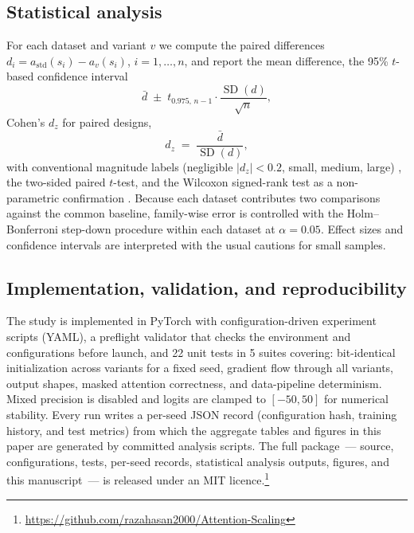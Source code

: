 \subsection{Statistical analysis}\label{sec:stats}
For each dataset and variant $v$ we compute the paired differences
$d_i = a_{\text{std}}(s_i) - a_{v}(s_i)$, $i = 1, \dots, n$, and report the mean
difference, the 95\% $t$-based confidence interval
\begin{equation}\label{eq:ci}
  \bar d \;\pm\; t_{0.975,\,n-1} \cdot \frac{\operatorname{SD}(d)}{\sqrt{n}},
\end{equation}
Cohen's $d_z$ for paired designs,
\begin{equation}\label{eq:dz}
  d_z \;=\; \frac{\bar d}{\operatorname{SD}(d)},
\end{equation}
with conventional magnitude labels (negligible $|d_z| < 0.2$, small, medium,
large) \cite{cohen1988}, the two-sided paired $t$-test, and the Wilcoxon
signed-rank test as a non-parametric confirmation \cite{wilcoxon1945}. Because
each dataset contributes two comparisons against the common baseline, family-wise
error is controlled with the Holm--Bonferroni step-down procedure
\cite{holm1979} within each dataset at $\alpha = 0.05$. Effect sizes and
confidence intervals are interpreted with the usual cautions for small samples.

\subsection{Implementation, validation, and reproducibility}\label{sec:impl}
The study is implemented in PyTorch with configuration-driven experiment scripts
(YAML), a preflight validator that checks the environment and configurations
before launch, and 22 unit tests in 5 suites covering: bit-identical
initialization across variants for a fixed seed, gradient flow through all
variants, output shapes, masked attention correctness, and data-pipeline
determinism. Mixed precision is disabled and logits are clamped to $[-50, 50]$
for numerical stability. Every run writes a per-seed JSON record (configuration
hash, training history, and test metrics) from which the aggregate tables and
figures in this paper are generated by committed analysis scripts. The full
package~--- source, configurations, tests, per-seed records, statistical
analysis outputs, figures, and this manuscript~--- is released under an MIT
licence.\footnote{\url{https://github.com/razahasan2000/Attention-Scaling}}

